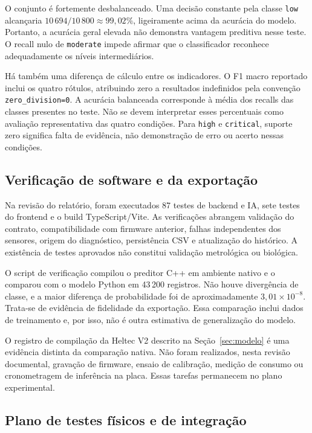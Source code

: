O conjunto é fortemente desbalanceado. Uma decisão constante pela
classe \texttt{low} alcançaria
$10\,694/10\,800\approx99{,}02\%$, ligeiramente acima da acurácia
do modelo. Portanto, a acurácia geral elevada não demonstra vantagem
preditiva nesse teste. O recall nulo de \texttt{moderate} impede
afirmar que o classificador reconhece adequadamente os níveis
intermediários.

Há também uma diferença de cálculo entre os indicadores. O F1 macro
reportado inclui os quatro rótulos, atribuindo zero a resultados
indefinidos pela convenção \texttt{zero\_division=0}. A acurácia
balanceada corresponde à média dos recalls das classes presentes
no teste. Não se devem interpretar esses percentuais como avaliação
representativa das quatro condições. Para \texttt{high} e
\texttt{critical}, suporte zero significa falta de evidência,
não demonstração de erro ou acerto nessas condições.

\subsection{Verificação de software e da exportação}

Na revisão do relatório, foram executados 87 testes de backend e IA,
sete testes do frontend e o build TypeScript/Vite. As verificações
abrangem validação do contrato, compatibilidade com firmware anterior,
falhas independentes dos sensores, origem do diagnóstico, persistência
CSV e atualização do histórico. A existência de testes aprovados
não constitui validação metrológica ou biológica.

O script de verificação compilou o preditor C++ em ambiente nativo
e o comparou com o modelo Python em 43\,200 registros. Não houve
divergência de classe, e a maior diferença de probabilidade foi de
aproximadamente $3{,}01\times10^{-8}$. Trata-se de evidência de
fidelidade da exportação. Essa comparação inclui dados de treinamento
e, por isso, não é outra estimativa de generalização do modelo.

O registro de compilação da Heltec V2 descrito na
Seção~\ref{sec:modelo} é uma evidência distinta da comparação nativa.
Não foram realizados, nesta revisão documental, gravação de firmware, ensaio de
calibração, medição de consumo ou cronometragem de inferência na placa.
Essas tarefas permanecem no plano experimental.

\subsection{Plano de testes físicos e de integração}

